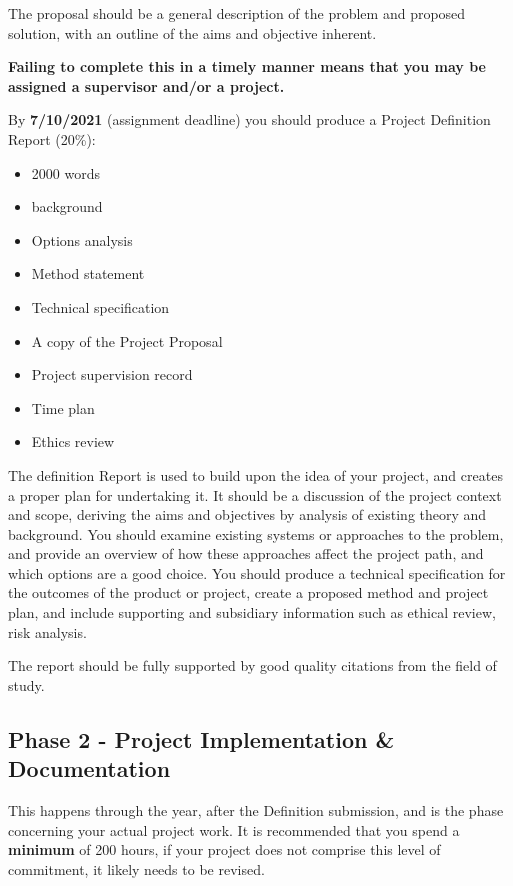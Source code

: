 The proposal should be a general description of the problem and proposed solution, with an outline of the aims and objective inherent. 

\medskip

\textbf{Failing to complete this in a timely manner means that you may be assigned a supervisor and/or a project.}

\medskip

By \textbf{7/10/2021} (assignment deadline) you should produce a Project Definition Report (20\%):

\begin{itemize}
    \item 2000 words
    \item background
    \item Options analysis
    \item Method statement
    \item Technical specification
    \item A copy of the Project Proposal
    \item Project supervision record
    \item Time plan
    \item Ethics review
\end{itemize}

The definition Report is used to build upon the idea of your project, and creates a proper plan for undertaking it. It should be a discussion of the project context and scope, deriving the aims and objectives by analysis of existing theory and background. You should examine existing systems or approaches to the problem, and provide an overview of how these approaches affect the project path, and which options are a good choice. You should produce a technical specification for the outcomes of the product or project, create a proposed method and project plan, and include supporting and subsidiary information such as ethical review, risk analysis. 

The report should be fully supported by good quality citations from the field of study.

\subsection{Phase 2 - Project Implementation \& Documentation}

This happens through the year, after the Definition submission, and is the phase concerning your actual project work. It is recommended that you spend a \textbf{minimum} of 200 hours, if your project does not comprise this level of commitment, it likely needs to be revised.

